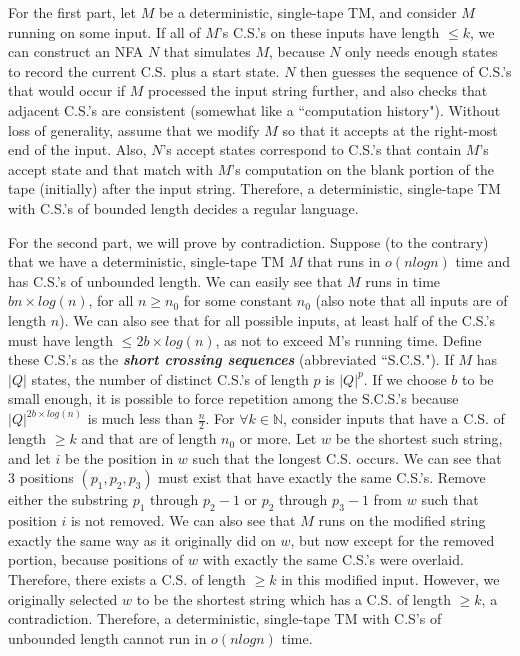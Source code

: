 \begin{enumerate}
\par For the first part, let $M$ be a deterministic, single-tape TM, and consider $M$ running on some input. If all of $M$'s C.S.'s on these inputs have length $\le k$, we can construct an NFA $N$ that simulates $M$, because $N$ only needs enough states to record the current C.S. plus a start state. $N$ then guesses the sequence of C.S.'s that would occur if $M$ processed the input string further, and also checks that adjacent C.S.'s are consistent (somewhat like a ``computation history"). Without loss of generality, assume that we modify $M$ so that it accepts at the right-most end of the input. Also, $N$'s accept states correspond to C.S.'s that contain $M$'s accept state and that match with $M$'s computation on the blank portion of the tape (initially) after the input string. Therefore, a deterministic, single-tape TM with C.S.'s of bounded length decides a regular language.

\par For the second part, we will prove by contradiction. Suppose (to the contrary) that we have a deterministic, single-tape TM $M$ that runs in $o(n log n)$ time and has C.S.'s of unbounded length. We can easily see that $M$ runs in time $bn \times log(n)$, for all $n \ge n_0$ for some constant $n_0$ (also note that all inputs are of length $n$). We can also see that for all possible inputs, at least half of the C.S.'s must have length $\le 2b \times log(n)$, as not to exceed M's running time. Define these C.S.'s as the \textbf{\emph{short crossing sequences}} (abbreviated ``S.C.S."). If $M$ has $|Q|$ states, the number of distinct C.S.'s of length $p$ is $|Q|^p$. If we choose $b$ to be small enough, it is possible to force repetition among the S.C.S.'s because $|Q|^{2b\times log(n)}$ is much less than $\frac{n}{2}$. For $\forall k \in \mathbb{N}$, consider inputs that have a C.S. of length $\ge k$ and that are of length $n_0$ or more. Let $w$ be the shortest such string, and let $i$ be the position in $w$ such that the longest C.S. occurs. We can see that 3 positions $(p_1, p_2, p_3)$ must exist that have exactly the same C.S.'s. Remove either the substring $p_1$ through $p_2-1$ or $p_2$ through $p_3-1$ from $w$ such that position $i$ is not removed. We can also see that $M$ runs on the modified string exactly the same way as it originally did on $w$, but now except for the removed portion, because positions of $w$ with exactly the same C.S.'s were overlaid. Therefore, there exists a C.S. of length $\ge k$ in this modified input. However, we originally selected $w$ to be the shortest string which has a C.S. of length $\ge k$, a contradiction. Therefore, a deterministic, single-tape TM with C.S's of unbounded length cannot run in $o(n log n)$ time.


\end{enumerate}